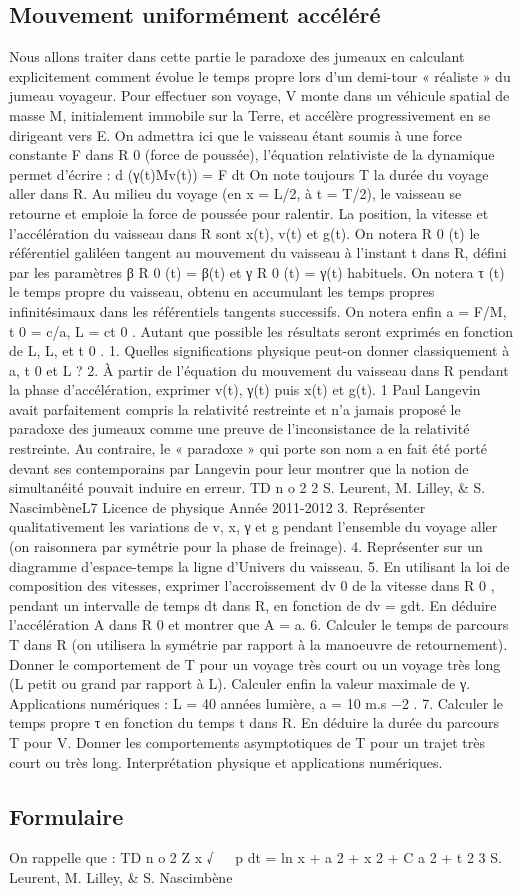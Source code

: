 \subsection{Mouvement uniformément accéléré}%
Nous allons traiter dans cette partie le paradoxe des jumeaux en calculant explicitement
comment évolue le temps propre lors d’un demi-tour « réaliste » du jumeau voyageur.
Pour effectuer son voyage, V monte dans un véhicule spatial de masse M, initialement immobile
sur la Terre, et accélère progressivement en se dirigeant vers E. On admettra ici que le vaisseau
étant soumis à une force constante F dans R 0 (force de poussée), l’équation relativiste de la
dynamique permet d’écrire :
d
(γ(t)Mv(t)) = F
dt
On note toujours T la durée du voyage aller dans R. Au milieu du voyage (en x = L/2, à t = T/2),
le vaisseau se retourne et emploie la force de poussée pour ralentir. La position, la vitesse et
l’accélération du vaisseau dans R sont x(t), v(t) et g(t). On notera R 0 (t) le référentiel galiléen
tangent au mouvement du vaisseau à l’instant t dans R, défini par les paramètres β R 0 (t) = β(t)
et γ R 0 (t) = γ(t) habituels. On notera τ (t) le temps propre du vaisseau, obtenu en accumulant les
temps propres infinitésimaux dans les référentiels tangents successifs. On notera enfin a = F/M,
t 0 = c/a, L = ct 0 . Autant que possible les résultats seront exprimés en fonction de L, L, et t 0 .
1. Quelles significations physique peut-on donner classiquement à a, t 0 et L ?
2. À partir de l’équation du mouvement du vaisseau dans R pendant la phase d’accélération,
exprimer v(t), γ(t) puis x(t) et g(t).
1
Paul Langevin avait parfaitement compris la relativité restreinte et n’a jamais proposé le paradoxe des jumeaux
comme une preuve de l’inconsistance de la relativité restreinte. Au contraire, le « paradoxe » qui porte son
nom a en fait été porté devant ses contemporains par Langevin pour leur montrer que la notion de simultanéité
pouvait induire en erreur.
TD n o 2
2
S. Leurent, M. Lilley, & S. NascimbèneL7
Licence de physique
Année 2011-2012
3. Représenter qualitativement les variations de v, x, γ et g pendant l’ensemble du voyage
aller (on raisonnera par symétrie pour la phase de freinage).
4. Représenter sur un diagramme d’espace-temps la ligne d’Univers du vaisseau.
5. En utilisant la loi de composition des vitesses, exprimer l’accroissement dv 0 de la vitesse
dans R 0 , pendant un intervalle de temps dt dans R, en fonction de dv = gdt. En déduire
l’accélération A dans R 0 et montrer que A = a.
6. Calculer le temps de parcours T dans R (on utilisera la symétrie par rapport à la manoeuvre
de retournement). Donner le comportement de T pour un voyage très court ou un voyage
très long (L petit ou grand par rapport à L). Calculer enfin la valeur maximale de γ.
Applications numériques : L = 40 années lumière, a = 10 m.s −2 .
7. Calculer le temps propre τ en fonction du temps t dans R. En déduire la durée du parcours
T pour V. Donner les comportements asymptotiques de T pour un trajet très court ou
très long. Interprétation physique et applications numériques.

\subsection{Formulaire}%
On rappelle que :
TD n o 2
Z x
√


p
dt
= ln x + a 2 + x 2 + C
a 2 + t 2
3
S. Leurent, M. Lilley, & S. Nascimbène
